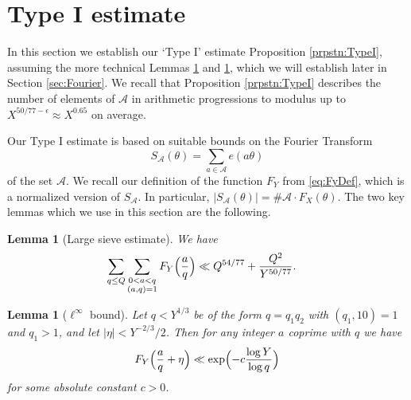 \documentclass[10pt]{amsart}
\theoremstyle{plain}
\newtheorem{lmm}[thrm]{Lemma}
\numberwithin{sblmm}{thrm}
\numberwithin{equation}{section}
\begin{document}
\section{Type I estimate}\label{sec:TypeI}
%
%
%
%
In this section we establish our `Type I' estimate Proposition \ref{prpstn:TypeI}, assuming the more technical Lemmas \ref{lmm:LargeSieveTypeI} and \ref{lmm:LInfTypeI}, which we will establish later  in Section \ref{sec:Fourier}. We recall that Proposition \ref{prpstn:TypeI} describes the number of elements of $\mathcal{A}$ in arithmetic progressions to modulus up to $X^{50/77-\epsilon}\approx X^{0.65}$ on average.

Our Type I estimate is based on suitable bounds on the Fourier Transform
\[
S_{\mathcal{A}}(\theta)=\sum_{a\in\mathcal{A}}e(a\theta)
\]
of the set $\mathcal{A}$. We recall our definition of the function $F_Y$ from \eqref{eq:FyDef}, which is a normalized version of $S_\mathcal{A}$. In particular, $|S_\mathcal{A}(\theta)|=\#\mathcal{A}\cdot F_X(\theta)$. The two key lemmas which we use in this section are the following.
%
%
%
%
\begin{lmm}[Large sieve estimate]\label{lmm:LargeSieveTypeI}
%
We have
\begin{align*}
\sum_{q\le Q}\sum_{\substack{0<a<q\\ (a,q)=1}}F_{Y}\Bigl(\frac{a}{q}\Bigr)&\ll  Q^{54/77}+\frac{Q^2}{Y^{50/77}}.
\end{align*}
\end{lmm}
%
%
%
%
\begin{lmm}[$\ell^\infty$ bound]\label{lmm:LInfTypeI}
%
Let $q<Y^{1/3}$ be of the form $q=q_1q_2$ with $(q_1,10)=1$ and $q_1>1$, and let $|\eta|<Y^{-2/3}/2$. Then for any integer $a$ coprime with $q$ we have 
\[ 
F_{Y}\Bigl(\frac{a}{q}+\eta\Bigr)\ll \exp\Bigl(-c\frac{\log{Y}}{\log{q}}\Bigr)
\]
for some absolute constant $c>0$.
%
\end{lmm}
%
%
%
%
%
\end{document}
